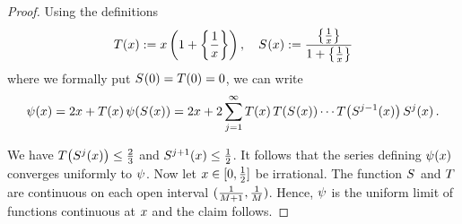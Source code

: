 \begin{proof}
    Using the definitions
    \begin{align*}
      \OutsideOf{\TheVariable}
      := \TheVariable
      \Parentheses{1+\GaussOf{\frac{1}{\TheVariable}}}, \quad 
      \InsideOf{\TheVariable}
      := \frac{
      \GaussOf{\frac{1}{\TheVariable}}
      }{
      1+\GaussOf{\frac{1}{\TheVariable}}
      }
    \end{align*}
    where we formally put $\InsideOf{0} = \OutsideOf{0} = 0$, we can
  write
    \[
      \EssentialCostOf{\TheVariable} =
      2 \TheVariable
      +
      \OutsideOf{\TheVariable}\EssentialCostOf{\InsideOf{\TheVariable}}
    =
        2 \TheVariable +
        2\sum_{\TheIndex=1}^{\infty}
        \OutsideOf{\TheVariable}
        \OutsideOf{\InsideOf{\TheVariable}}
        \cdots
        \OutsideOf{\InsideOf[\TheIndex-1]{\TheVariable}}
        \InsideOf[\TheIndex]{\TheVariable}
        .
   \] %

    We have  $\OutsideOf{\InsideOf[\TheIndex]{\TheVariable}}\leq \frac23$
    and $\InsideOf[\TheIndex+1]{\TheVariable}\leq\frac12$.
    It follows that 
   the
    series defining $\EssentialCostOf{\TheVariable}$ converges
    uniformly to $\psi_{}$. Now let $x\in[0,\frac12]$ be irrational.  The function
    $S^{}$ and $T$ are continuous on each open interval
    $(\frac{1}{M+1},\frac{1}{M})$. %
   Hence, $\psi_{}$ is the uniform limit of functions continuous
    at $x$ and the claim follows.
  \end{proof}

